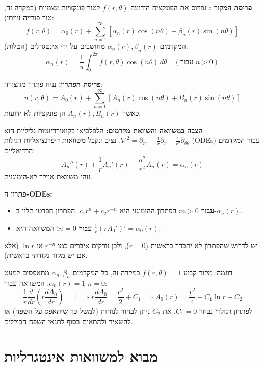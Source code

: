 \begin{steps}
\item \textbf{פריסת המקור :}
נפרוס את הפונקציה הידועה $f(r, \theta)$ לטור פונקציות עצמיות (במקרה זה, טור פורייה זוויתי):
\[
f(r, \theta) = \alpha_0(r) + \sum_{n=1}^{\infty} \left[ \alpha_n(r) \cos(n\theta) + \beta_n(r) \sin(n\theta) \right]
\]
המקדמים $\alpha_n(r), \beta_n(r)$ מחושבים על ידי אינטגרלים (הטלות):
\[
\alpha_n(r) = \frac{1}{\pi} \int_{0}^{2\pi} f(r, \theta) \cos(n\theta) \, d\theta \quad (\text{עבור } n>0)
\]

\item \textbf{פריסת הפתרון:}
נניח פתרון מהצורה:
\[
u(r, \theta) = A_0(r) + \sum_{n=1}^{\infty} \left[ A_n(r) \cos(n\theta) + B_n(r) \sin(n\theta) \right]
\]
כאשר $A_n(r), B_n(r)$ הן פונקציות לא ידועות.

\item \textbf{הצבה במשוואה והשוואת מקדמים:}
הלפלסיאן בקואורדינטות גליליות הוא $\nabla^2 = \partial_{rr} + \frac{1}{r}\partial_r + \frac{1}{r^2}\partial_{\theta\theta}$. נציב ונקבל משוואות דיפרנציאליות רגילות (ODEs) עבור המקדמים הרדיאליים:
\[
A_n''(r) + \frac{1}{r}A_n'(r) - \frac{n^2}{r^2}A_n(r) = \alpha_n(r)
\]
זוהי משוואת אוילר לא-הומוגנית.

\item \textbf{פתרון ה-ODEs:}
\begin{itemize}
    \item \textbf{עבור $n > 0$:} הפתרון ההומוגני הוא $c_1 r^n + c_2 r^{-n}$. הפתרון הפרטי תלוי ב-$\alpha_n(r)$.
    \item \textbf{עבור $n = 0$:} המשוואה היא $\frac{1}{r}(r A_0')' = \alpha_0(r)$.
\end{itemize}
יש לדרוש שהפתרון לא יתבדר בראשית ($r=0$), ולכן זורקים איברים כמו $r^{-n}$ או $\ln r$ (אלא אם יש מקור נקודתי בראשית).
\end{steps}

\begin{examplebox}{דוגמה: מקור קבוע $f(r, \theta) = 1$}
במקרה זה, כל המקדמים $\alpha_n, \beta_n$ מתאפסים למעט $\alpha_0(r) = 1$.
המשוואה עבור $n=0$:
\[
\frac{1}{r}\frac{d}{dr}\left(r \frac{dA_0}{dr}\right) = 1 \implies r \frac{dA_0}{dr} = \frac{r^2}{2} + C_1 \implies A_0(r) = \frac{r^2}{4} + C_1 \ln r + C_2
\]
לפתרון רגולרי נבחר $C_1 = 0$. את $C_2$ ניתן לבחור לנוחות (למשל כך שיתאפס על השפה) או להשאיר ולהתאים בסוף לתנאי השפה הכוללים.
\end{examplebox}

\section{מבוא למשוואות אינטגרליות}

